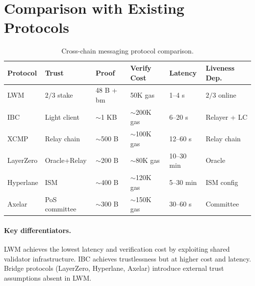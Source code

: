 \section{Comparison with Existing Protocols}
\label{sec:comparison}

\begin{table}[H]
\centering
\caption{Cross-chain messaging protocol comparison.}
\label{tab:comparison}
\begin{tabular}{p{2.2cm}p{1.8cm}p{1.5cm}p{2cm}p{1.8cm}p{2cm}}
\toprule
\textbf{Protocol} & \textbf{Trust} & \textbf{Proof} & \textbf{Verify Cost} & \textbf{Latency} & \textbf{Liveness Dep.} \\
\midrule
LWM & $2/3$ stake & 48 B + bm & 50K gas & 1--4 s & $2/3$ online \\
IBC & Light client & $\sim$1 KB & $\sim$200K gas & 6--20 s & Relayer + LC \\
XCMP & Relay chain & $\sim$500 B & $\sim$100K gas & 12--60 s & Relay chain \\
LayerZero & Oracle+Relay & $\sim$200 B & $\sim$80K gas & 10--30 min & Oracle \\
Hyperlane & ISM & $\sim$400 B & $\sim$120K gas & 5--30 min & ISM config \\
Axelar & PoS committee & $\sim$300 B & $\sim$150K gas & 30--60 s & Committee \\
\bottomrule
\end{tabular}
\end{table}

\paragraph{Key differentiators.} LWM achieves the lowest latency and verification cost by exploiting shared validator infrastructure. IBC achieves trustlessness but at higher cost and latency. Bridge protocols (LayerZero, Hyperlane, Axelar) introduce external trust assumptions absent in LWM.


